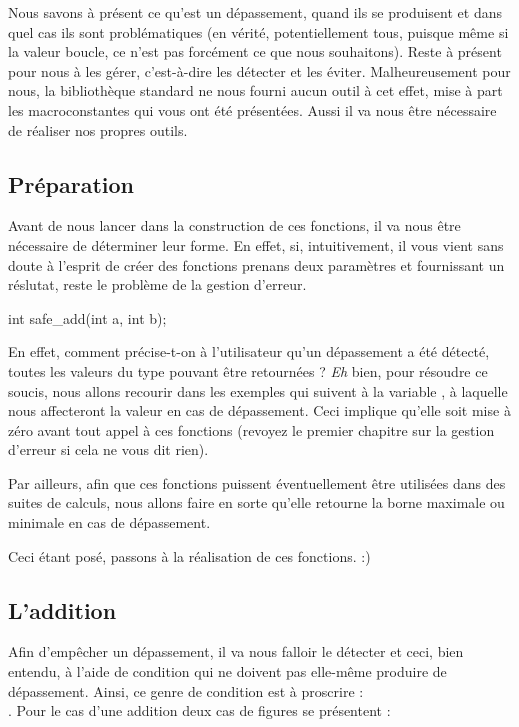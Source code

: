 Nous savons à présent ce qu'est un dépassement, quand ils se produisent 
et dans quel cas ils sont problématiques (en vérité, potentiellement 
tous, puisque même si la valeur boucle, ce n'est pas forcément ce que nous 
souhai\-tons). Reste à présent pour nous à les gérer, c'est-à-dire les détecter 
et les éviter. Malheureusement pour nous, la bibliothèque standard ne nous 
fourni aucun outil à cet effet, mise à part les macroconstantes qui vous ont été
présentées. Aussi il va nous être nécessaire de réaliser nos propres outils.

\subsection{Préparation}
\label{preparation}

Avant de nous lancer dans la construction de ces fonctions, il va nous
être nécessaire de déterminer leur forme. En effet, si, intuitivement,
il vous vient sans doute à l'esprit de créer des fonctions prenans deux
paramètres et fournissant un réslutat, reste le problème de la gestion
d'erreur.

\begin{C}
int safe_add(int a, int b);
\end{C}

En effet, comment précise-t-on à l'utilisateur qu'un dépassement a été
détecté, toutes les valeurs du type  pouvant être retournées
? \emph{Eh} bien, pour résoudre ce soucis, nous allons recourir dans les
exemples qui suivent à la variable , à laquelle nous
affecteront la valeur  en cas de dépassement. Ceci
implique qu'elle soit mise à zéro avant tout appel à ces fonctions
(revoyez le premier chapitre sur la gestion d'erreur si cela ne vous dit
rien).

Par ailleurs, afin que ces fonctions puissent éventuellement être
utilisées dans des suites de calculs, nous allons faire en sorte qu'elle
retourne la borne maximale ou minimale en cas de dépassement.

Ceci étant posé, passons à la réalisation de ces fonctions. :)

\subsection{L'addition}
\label{laddition-1}

Afin d'empêcher un dépassement, il va nous falloir le détecter et ceci,
bien entendu, à l'aide de condition qui ne doivent pas elle-même
produire de dépassement. Ainsi, ce genre de condition est à proscrire :\\
. Pour le cas d'une
addition deux cas de figures se présentent :

